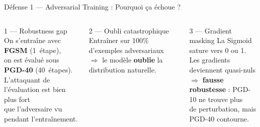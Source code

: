 \documentclass[aspectratio=169,11pt]{beamer}
\begin{document}
\begin{frame}{D\'efense 1 --- Adversarial Training : Pourquoi \c{c}a \'echoue ?}
\begin{columns}[T]
\begin{alertblock}{1 --- Robustness gap}
On s'entra\^ine avec \textbf{FGSM} (1~\'etape),\\
on est \'evalu\'e sous \textbf{PGD-40} (40~\'etapes).\\[0.4em]
L'attaquant de l'\'evaluation est bien plus fort\\
que l'adversaire vu pendant l'entra\^inement.
\end{alertblock}

\begin{alertblock}{2 --- Oubli catastrophique}
Entra\^iner sur 100\% d'exemples adversariaux\\
$\Rightarrow$ le mod\`ele \textbf{oublie} la distribution naturelle.
\end{alertblock}
\vspace{0.4em}
\begin{alertblock}{3 --- Gradient masking}
La Sigmoid sature vers 0 ou 1.\\
Les gradients deviennent quasi-nuls\\
$\Rightarrow$ \textbf{fausse robustesse} : PGD-10 ne trouve plus\\
de perturbation, mais PGD-40 contourne.
\end{alertblock}
\end{columns}
\end{frame}
\end{document}

